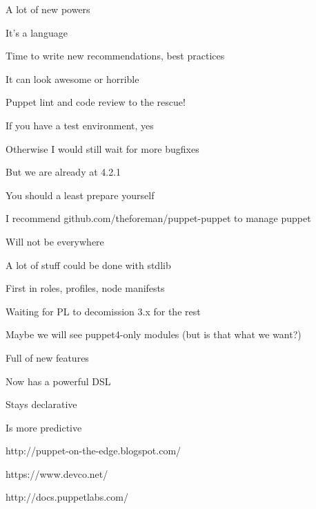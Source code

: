 \begin{iframe}
\item A lot of new powers
\item It's a language
\item Time to write new recommendations, best practices
\item It can look awesome or horrible
\item Puppet lint and code review to the rescue!
\end{iframe}

\begin{iframe}
\item If you have a test environment, yes
\item Otherwise I would still wait for more bugfixes
\item But we are already at 4.2.1
\item You should a least prepare yourself
\item I recommend github.com/theforeman/puppet-puppet to manage puppet
\end{iframe}

\begin{iframe}
\item Will not be everywhere
\item A lot of stuff could be done with stdlib
\item First in roles, profiles, node manifests
\item Waiting for PL to decomission 3.x for the rest
\item Maybe we will see puppet4-only modules (but is that what we want?)
\end{iframe}

\begin{iframe}[Puppet 4]
\item Full of new features
\item Now has a powerful DSL
\item Stays declarative
\item Is more predictive
\end{iframe}


\begin{iframe}[Bio]
\item http://puppet-on-the-edge.blogspot.com/
\item https://www.devco.net/
\item http://docs.puppetlabs.com/
\end{iframe}

\contactSlide


